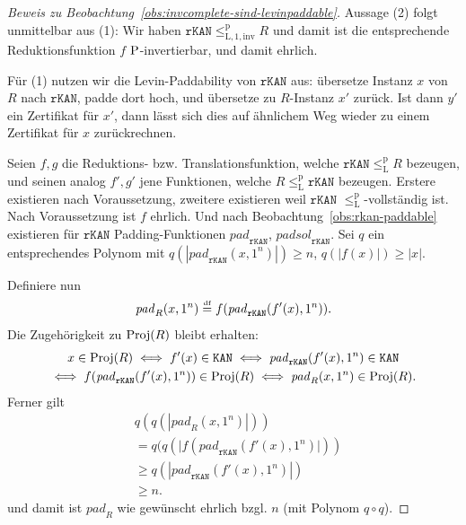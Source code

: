 \medskip
\begin{proof}[Beweis zu Beobachtung~\ref{obs:invcomplete-sind-levinpaddable}]
    Aussage (2) folgt unmittelbar aus (1): Wir haben $\mathtt{rKAN}\leq_\mathrm{L,1,inv}^\mathrm{p} R$ und damit ist die entsprechende Reduktionsfunktion $f$ $\P$-invertierbar, und damit ehrlich.

    Für (1) nutzen wir die Levin-Paddability von $\mathtt{rKAN}$ aus: übersetze Instanz $x$ von $R$ nach $\mathtt{rKAN}$, padde dort hoch, und übersetze zu $R$-Instanz $x'$ zurück. Ist dann $y'$ ein Zertifikat für $x'$, dann lässt sich dies auf ähnlichem Weg wieder zu einem Zertifikat für $x$ zurückrechnen.

    Seien $f, g$ die Reduktions- bzw. Translationsfunktion, welche $\mathtt{rKAN}\leq_\mathrm{L}^\mathrm p R$ bezeugen, und seinen analog $f', g'$ jene Funktionen, welche $R\leq_\mathrm{L}^\mathrm p \mathtt{rKAN}$ bezeugen. Erstere existieren nach Voraussetzung, zweitere existieren weil $\mathtt{rKAN}$ $\leq_\mathrm{L}^\mathrm p$-vollständig ist.
    Nach Voraussetzung ist $f$ ehrlich. %
    Und nach Beobachtung~\ref{obs:rkan-paddable} existieren für $\mathtt{rKAN}$ Padding-Funktionen $\mathit{pad}_\mathtt{rKAN}$, $\mathit{padsol}_\mathtt{rKAN}$.
    Sei $q$ ein entsprechendes Polynom mit $q(|\mathit{pad}_\mathtt{rKAN}(x, 1^n)|)\geq n$, $q(|f(x)|) \geq |x|$.

    Definiere nun
    \[ \mathit{pad}_R(x, 1^n) \defeq  f(\mathit{pad}_\mathtt{rKAN}(f'(x), 1^n)). \]
    Die Zugehörigkeit zu $\Proj(R)$ bleibt erhalten:
    \begin{gather*}
        x\in \Proj(R) \iff f'(x) \in \mathtt{KAN} \iff \mathit{pad}_\mathtt{rKAN}(f'(x), 1^n) \in \mathtt{KAN}\\ \iff f(\mathit{pad}_\mathtt{rKAN}(f'(x), 1^n)) \in \Proj(R) \iff \mathit{pad}_R(x, 1^n) \in\Proj(R).
    \end{gather*}
    Ferner gilt
    \begin{align*} &q(q(|\mathit{pad}_R(x, 1^n)|)) \\&= q(q(|f(\mathit{pad}_\mathtt{rKAN}(f'(x), 1^n)|))\\&\geq q(|\mathit{pad}_\mathtt{rKAN}(f'(x), 1^n)|)\\ &\geq n.
    \end{align*}
    und damit ist $\mathit{pad}_R$ wie gewünscht ehrlich bzgl. $n$ (mit Polynom $q\circ q$).


\end{proof}
